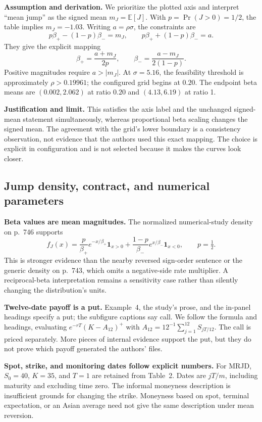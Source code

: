 \documentclass[11pt,a4paper]{article}
\newcommand{\E}{\mathbb{E}}
\begin{document}
\textbf{Assumption and derivation.} We prioritize the plotted axis and
interpret ``mean jump'' as the signed mean $m_J=\E[J]$. With
$p=\Pr(J>0)=1/2$, the table implies $m_J=-1.03$. Writing
$a=\rho\sigma$, the constraints are
\[
p\beta_+-(1-p)\beta_-=m_J,\qquad
p\beta_++(1-p)\beta_-=a.
\]
They give the explicit mapping
\begin{equation}
\boxed{\beta_+=\frac{a+m_J}{2p},\qquad
\beta_-=\frac{a-m_J}{2(1-p)}}.
\end{equation}
Positive magnitudes require $a>|m_J|$. At $\sigma=5.16$, the feasibility
threshold is approximately $\rho>0.19961$; the configured grid begins
at $0.20$. The endpoint beta means are $(0.002,2.062)$ at ratio $0.20$
and $(4.13,6.19)$ at ratio 1.

\textbf{Justification and limit.} This satisfies the axis label and the
unchanged signed-mean statement simultaneously, whereas proportional
beta scaling changes the signed mean. The agreement with the grid's
lower boundary is a consistency observation, not evidence that the
authors used this exact mapping. The choice is explicit in configuration
and is not selected because it makes the curves look closer.

\clearpage
\subsection{Jump density, contract, and numerical parameters}
\textbf{Beta values are mean magnitudes.} The normalized numerical-study
density on p.~746 supports
\[
f_J(x)=\frac{p}{\beta_+}e^{-x/\beta_+}\mathbf{1}_{x>0}
+\frac{1-p}{\beta_-}e^{x/\beta_-}\mathbf{1}_{x<0},\qquad p=\tfrac12.
\]
This is stronger evidence than the nearby reversed sign-order sentence
or the generic density on p.~743, which omits a negative-side rate
multiplier. A reciprocal-beta interpretation remains a sensitivity
case rather than silently changing the distribution's units.

\textbf{Twelve-date payoff is a put.} Example~4, the study's prose,
and the in-panel headings specify a put; the subfigure captions say
call. We follow the formula and headings, evaluating
$e^{-rT}(K-A_{12})^+$ with $A_{12}=12^{-1}\sum_{j=1}^{12}S_{jT/12}$.
The call is priced separately. More pieces of internal evidence support
the put, but they do not prove which payoff generated the authors' files.

\textbf{Spot, strike, and monitoring dates follow explicit numbers.}
For MRJD, $S_0=40$, $K=35$, and $T=1$ are retained from Table~2.
Dates are $jT/m$, including maturity and excluding time zero.
The informal moneyness description is insufficient grounds for changing
the strike. Moneyness based on spot, terminal expectation, or an Asian
average need not give the same description under mean reversion.
\end{document}
